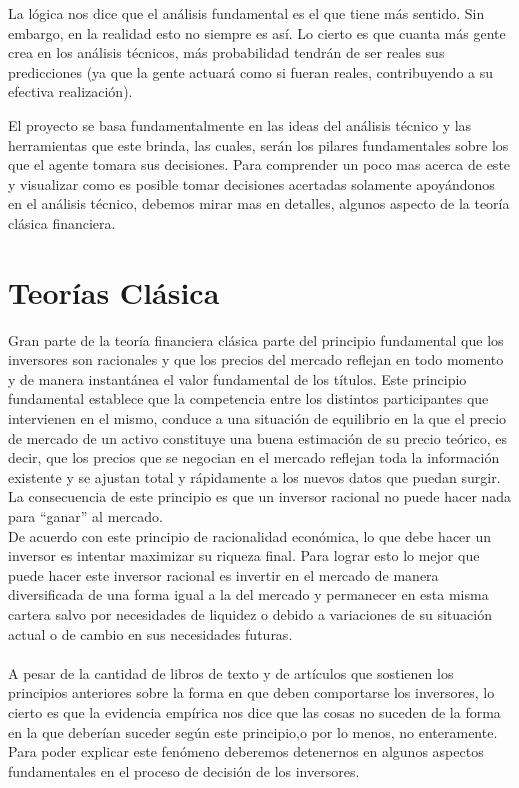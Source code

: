 La lógica nos dice que el análisis fundamental es el que tiene más sentido. Sin embargo, en la realidad esto no siempre es así. Lo cierto es que cuanta más gente crea en los análisis técnicos, más probabilidad tendrán de ser reales sus predicciones (ya que la gente actuará como si fueran reales, contribuyendo a su efectiva realización).

El proyecto se basa fundamentalmente en las ideas del análisis técnico y las herramientas que este brinda, las cuales, serán los pilares fundamentales sobre los que el agente tomara sus decisiones.
Para comprender un poco mas acerca de este y visualizar como es posible tomar decisiones acertadas solamente apoyándonos en el análisis técnico, debemos mirar mas en detalles, algunos aspecto de la teoría clásica financiera.

\section{Teorías Clásica}

Gran parte de la teoría financiera clásica parte del principio fundamental que los inversores son racionales y que los precios del mercado reflejan en todo momento y de manera instantánea el valor fundamental de los títulos.
Este principio fundamental establece que la competencia entre los distintos participantes que intervienen en el mismo, conduce a una situación de equilibrio en la que el precio de mercado de un activo constituye una buena estimación de su precio teórico, es decir, que los precios que se negocian en el mercado reflejan toda la información existente y se ajustan total y rápidamente a los nuevos datos que puedan surgir. La consecuencia de este principio es que un inversor racional no puede hacer nada para “ganar” al mercado.\\	

De acuerdo con este principio de racionalidad económica, lo que debe hacer un inversor es intentar maximizar su riqueza final. Para lograr esto lo mejor que puede hacer este inversor racional es invertir en el mercado de manera diversificada de una forma igual a la del mercado y permanecer en esta misma cartera salvo por necesidades de liquidez o debido a variaciones de su situación actual o de cambio en sus necesidades futuras.
\\\\
A pesar de la cantidad de libros de texto y de artículos que sostienen los principios anteriores sobre la forma en que deben comportarse los inversores, lo cierto es que la evidencia empírica nos dice que las cosas no suceden de la forma en la que deberían suceder según este principio,o por lo menos, no enteramente.
Para poder explicar este fenómeno deberemos detenernos en algunos aspectos fundamentales en el proceso de decisión de los inversores. 

